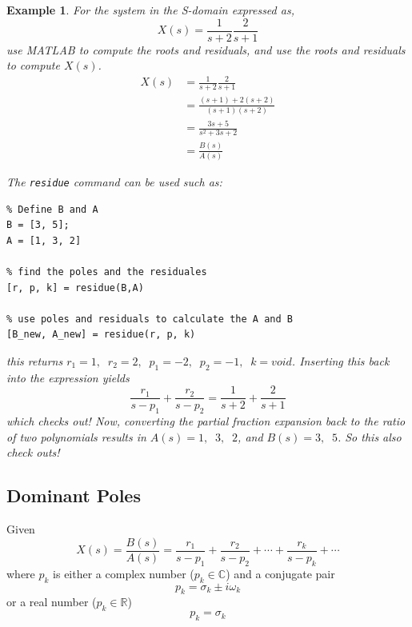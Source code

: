 \documentclass[12pt,letter]{article}
\newtheorem{ex}{Example}
\numberwithin{ex}{section} %
\newenvironment{example}{\begin{mdframed}[middlelinewidth=0.5mm]\begin{ex}\normalfont}{\end{ex}\end{mdframed}}
\numberwithin{re}{section} %
\numberwithin{equation}{section}	%
\begin{document}
\begin{example}

For the system in the S-domain expressed as,
\begin{equation}
X(s) = \frac{1}{s+2} \frac{2}{s+1}
\end{equation}
use MATLAB to compute the roots and residuals, and use the roots and residuals to compute $X(s)$.
\begin{align}
X(s) &= \frac{1}{s+2} \frac{2}{s+1} \\
& = \frac{(s+1)+2(s +2)}{(s+1)(s+2)} \nonumber \\
 &= \frac{3s+5}{s^2+3s+2}  \nonumber \\
&= \frac{B(s)}{A(s)} \nonumber 
\end{align}

\noindent The \texttt{residue} command can be used such as:

\lstset{linewidth=5.8in}
\begin{minipage}{1\textwidth}
  \begin{center}
    \lstset{%
caption=MATLAB code to find poles and resuduals.,
      basicstyle=\ttfamily\footnotesize\bfseries,
      frame=tb,
    }
\begin{lstlisting}
% Define B and A
B = [3, 5];
A = [1, 3, 2]

% find the poles and the residuales 
[r, p, k] = residue(B,A)

% use poles and residuals to calculate the A and B
[B_new, A_new] = residue(r, p, k)
\end{lstlisting}
  \end{center}
\end{minipage}
this returns $r_1 =1, \; \; r_2 =2, \; \; p_1 = -2, \; \; p_2 = -1, \; \; k=void$. Inserting this back into the expression yields 
\begin{equation}
\frac{r_1}{s-p_1} + \frac{r_2}{s-p_2} = \frac{1}{s+2} + \frac{2}{s+1}
\end{equation}
which checks out! Now, converting the partial fraction expansion back to the ratio of two polynomials results in $A(s) = 1,  \; \; 3,  \; \; 2$, and $B(s) = 3,  \; \; 5$. So this also check outs!
\end{example}

\subsection{Dominant Poles}

Given 
\begin{equation}
X(s) = \frac{B(s)}{A(s)} = \frac{r_1}{s-p_1} + \frac{r_2}{s-p_2} + \cdots + \frac{r_k}{s-p_k} + \cdots
\end{equation}
where $p_k$ is either a complex number ($p_k \in \mathbb{C}$) and a conjugate pair
\begin{equation}
p_k = \sigma_k \pm i\omega_k
\end{equation}
or a real number ($p_k \in \mathbb{R}$)
\begin{equation}
p_k = \sigma_k
\end{equation}
\end{document}

